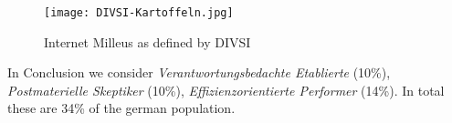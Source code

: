 \begin{figure}[hHtbp]
\centering
\texttt{[image: DIVSI-Kartoffeln.jpg]}
\caption{Internet Milleus as defined by DIVSI}
\label{fig:divsi_kartoffeln}
\end{figure}

In Conclusion we consider \textit{Verantwortungsbedachte Etablierte} (10\%),  \textit{Postmaterielle Skeptiker} (10\%),  \textit{Effizienzorientierte Performer} (14\%). In total these are 34\% of the german population.